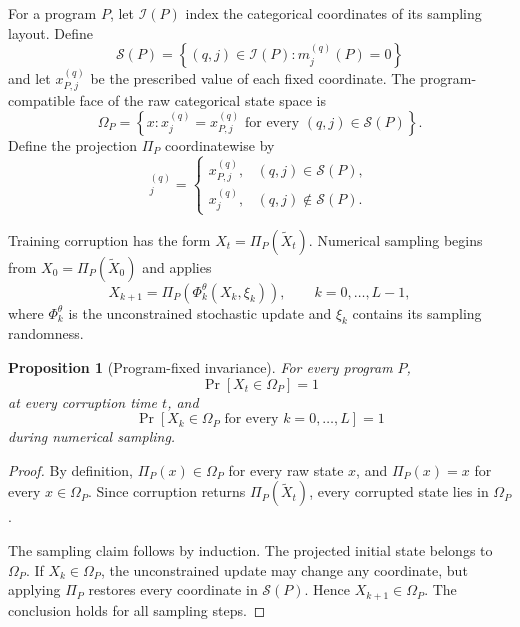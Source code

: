\documentclass{article}
\newtheorem{proposition}[theorem]{Proposition}
\begin{document}
For a program $P$, let $\mathcal I(P)$ index the categorical coordinates of its sampling layout.
Define
\begin{equation}
    \mathcal S(P)
    =
    \left\{
        (q,j)\in\mathcal I(P):
        m_j^{(q)}(P)=0
    \right\}
\end{equation}
and let $x_{P,j}^{(q)}$ be the prescribed value of each fixed coordinate.
The program-compatible face of the raw categorical state space is
\begin{equation}
    \Omega_P
    =
    \left\{
        x:
        x_j^{(q)}=x_{P,j}^{(q)}
        \text{ for every }(q,j)\in\mathcal S(P)
    \right\}.
\end{equation}
Define the projection $\Pi_P$ coordinatewise by
\begin{equation}
    [\Pi_P(x)]_j^{(q)}
    =
    \begin{cases}
        x_{P,j}^{(q)}, & (q,j)\in\mathcal S(P),\\
        x_j^{(q)}, & (q,j)\notin\mathcal S(P).
    \end{cases}
\end{equation}

Training corruption has the form $X_t=\Pi_P(\widetilde X_t)$.
Numerical sampling begins from $X_0=\Pi_P(\widetilde X_0)$ and applies
\begin{equation}
    X_{k+1}
    =
    \Pi_P\!\left(
        \Phi_k^\theta(X_k,\xi_k)
    \right),
    \qquad k=0,\ldots,L-1,
\end{equation}
where $\Phi_k^\theta$ is the unconstrained stochastic update and $\xi_k$ contains its sampling
randomness.

\begin{proposition}[Program-fixed invariance]
\label{prop:fixed-invariance}
For every program $P$,
\begin{equation}
    \Pr[X_t\in\Omega_P]=1
\end{equation}
at every corruption time $t$, and
\begin{equation}
    \Pr\left[
        X_k\in\Omega_P
        \text{ for every }k=0,\ldots,L
    \right]
    =1
\end{equation}
during numerical sampling.
\end{proposition}

\begin{proof}
By definition, $\Pi_P(x)\in\Omega_P$ for every raw state $x$, and
$\Pi_P(x)=x$ for every $x\in\Omega_P$.
Since corruption returns $\Pi_P(\widetilde X_t)$, every corrupted state lies in $\Omega_P$.

The sampling claim follows by induction.
The projected initial state belongs to $\Omega_P$.
If $X_k\in\Omega_P$, the unconstrained update may change any coordinate, but applying $\Pi_P$
restores every coordinate in $\mathcal S(P)$.
Hence $X_{k+1}\in\Omega_P$.
The conclusion holds for all sampling steps.
\end{proof}
\end{document}
